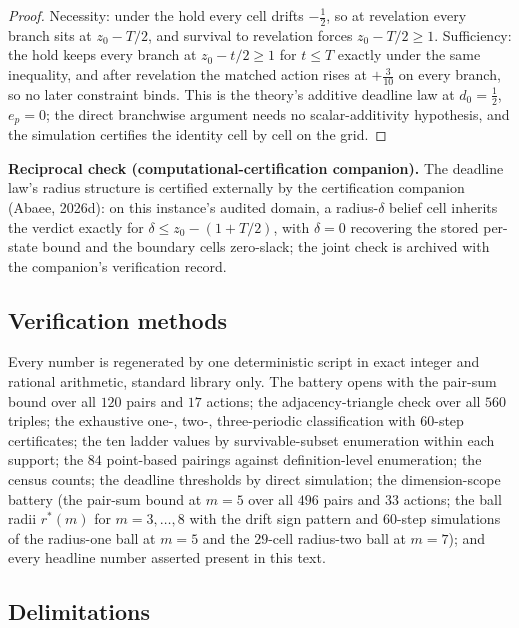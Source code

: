 \documentclass[10pt,twocolumn]{article}
\theoremstyle{plain}
\theoremstyle{definition}
\theoremstyle{remark}
\begin{document}
\begin{proof}
Necessity: under the hold every cell drifts \(-\tfrac12\), so at
revelation every branch sits at \(z_{0} - T/2\), and survival to
revelation forces \(z_{0} - T/2 \ge 1\). Sufficiency: the hold keeps
every branch at \(z_{0} - t/2 \ge 1\) for \(t \le T\) exactly
under the same inequality, and after revelation the matched action
rises at \(+\tfrac3{10}\) on every branch, so no later constraint
binds. This is the theory's additive deadline law at
\(d_{0} = \tfrac12\), \(e_{p} = 0\); the direct branchwise argument
needs no scalar-additivity hypothesis, and the simulation certifies
the identity cell by cell on the grid.
\end{proof}

\medskip
\noindent\textbf{Reciprocal check (computational-certification
companion).} The deadline law's radius structure is certified
externally by the certification companion (Abaee, 2026d): on this
instance's audited domain, a radius-\(\delta\) belief cell inherits
the verdict exactly for \(\delta \le z_{0} - (1 + T/2)\), with
\(\delta = 0\) recovering the stored per-state bound and the
boundary cells zero-slack; the joint check is archived with the
companion's verification record.

\subsection{Verification methods}\label{methods}

Every number is regenerated by one deterministic script in exact integer and rational arithmetic, standard library only. The battery opens with the pair-sum bound over all \(120\) pairs and \(17\) actions; the
adjacency-triangle check over all \(560\) triples; the exhaustive
one-, two-, three-periodic classification with \(60\)-step
certificates; the ten ladder values by survivable-subset enumeration
within each support; the \(84\) point-based pairings against
definition-level enumeration; the census counts; the deadline
thresholds by direct simulation; the dimension-scope battery (the
pair-sum bound at \(m = 5\) over all \(496\) pairs and \(33\)
actions; the ball radii \(r^{*}(m)\) for \(m = 3, \dots, 8\) with
the drift sign pattern and \(60\)-step simulations of the radius-one
ball at \(m = 5\) and the \(29\)-cell radius-two ball at
\(m = 7\)); and every headline number asserted present in this
text.

\subsection{Delimitations}\label{scope}
\end{document}
